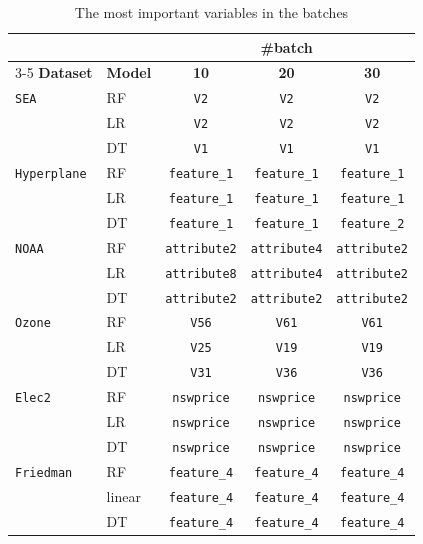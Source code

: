 \documentclass[pdflatex,sn-mathphys-ay]{sn-jnl}%
\theoremstyle{thmstyleone}%
\theoremstyle{thmstyletwo}%
\theoremstyle{thmstylethree}%
\begin{document}
\begin{table}[h]
    \centering
    \small
    \caption{The most important variables in the batches}
    \label{tab:vip_batch}
    \begin{tabular}{llccc}\toprule
                            &       & \multicolumn{3}{c}{\textbf{\#batch}}\\\cmidrule(lr){3-5}
        \textbf{Dataset}    & \textbf{Model} & \textbf{10}                    & \textbf{20}                    & \textbf{30} \\\midrule
        \texttt{SEA} & RF & \texttt{V2} & \texttt{V2} & \texttt{V2} \\
                            & LR & \texttt{V2} & \texttt{V2} & \texttt{V2} \\
                            & DT & \texttt{V1} & \texttt{V1} & \texttt{V1} \\
        \midrule
        \texttt{Hyperplane} & RF & \texttt{feature\_1} & \texttt{feature\_1} & \texttt{feature\_1} \\
                            & LR & \texttt{feature\_1} & \texttt{feature\_1} & \texttt{feature\_1} \\
                            & DT & \texttt{feature\_1} & \texttt{feature\_1} & \texttt{feature\_2} \\
        \midrule
        \texttt{NOAA} & RF & \texttt{attribute2} & \texttt{attribute4} & \texttt{attribute2} \\
                            & LR & \texttt{attribute8} & \texttt{attribute4} & \texttt{attribute2} \\
                            & DT & \texttt{attribute2} & \texttt{attribute2} & \texttt{attribute2} \\
        \midrule
        \texttt{Ozone} & RF & \texttt{V56} & \texttt{V61} & \texttt{V61} \\
                            & LR & \texttt{V25} & \texttt{V19} & \texttt{V19} \\
                            & DT & \texttt{V31} & \texttt{V36} & \texttt{V36} \\
        \midrule
        \texttt{Elec2} & RF & \texttt{nswprice} & \texttt{nswprice} & \texttt{nswprice} \\
                            & LR & \texttt{nswprice} & \texttt{nswprice} & \texttt{nswprice} \\
                            & DT & \texttt{nswprice} & \texttt{nswprice} & \texttt{nswprice} \\
        \midrule
        \texttt{Friedman} & RF & \texttt{feature\_4} & \texttt{feature\_4} & \texttt{feature\_4} \\
                            & linear & \texttt{feature\_4} & \texttt{feature\_4} & \texttt{feature\_4} \\
                            & DT & \texttt{feature\_4} & \texttt{feature\_4} & \texttt{feature\_4} \\
        \midrule
    \end{tabular}
\end{table}
\end{document}
